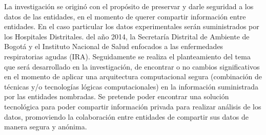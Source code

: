 \documentclass[a4paper,openright,12pt]{book}
\theoremstyle{definition}
\theoremstyle{remark}
\begin{document}
La investigación se originó con el propósito de preservar y darle seguridad a los datos de las entidades, en el momento de querer compartir información entre entidades. En el caso particular los datos experimentales serán suministrados por los Hospitales Distritales. del año 2014, la Secretaría Distrital de Ambiente de Bogotá y el Instituto Nacional de Salud enfocados a las enfermedades respiratorias agudas (IRA). Seguidamente se realiza el planteamiento del tema que será desarrollado en la investigación, de encontrar o no cambios significativos en el momento de aplicar una arquitectura computacional segura (combinación de técnicas y/o tecnologías lógicas computacionales) en la información suministrada por las entidades nombradas. Se pretende poder encontrar una solución tecnológica para poder compartir información privada para realizar análisis de los datos, promoviendo la colaboración entre entidades de compartir sus datos de manera segura y anónima.\\\\
\end{document}
